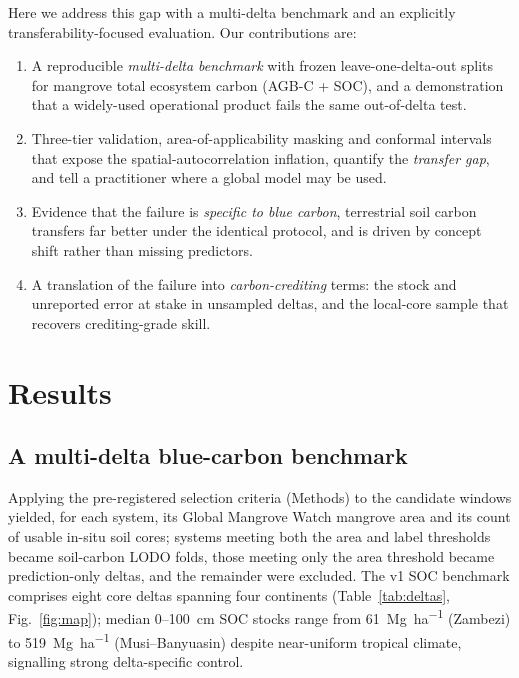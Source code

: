 \documentclass[11pt]{article}
\begin{document}
Here we address this gap with a multi-delta benchmark and an explicitly
transferability-focused evaluation. Our contributions are:
\begin{enumerate}
  \item A reproducible \emph{multi-delta benchmark} with frozen leave-one-delta-out
        splits for mangrove total ecosystem carbon (AGB-C + SOC), and a demonstration
        that a widely-used operational product fails the same out-of-delta test.
  \item Three-tier validation, area-of-applicability masking \citep{meyer2021} and
        conformal intervals that expose the spatial-autocorrelation inflation, quantify
        the \emph{transfer gap}, and tell a practitioner where a global model may be used.
  \item Evidence that the failure is \emph{specific to blue carbon}, terrestrial soil
        carbon transfers far better under the identical protocol, and is driven by
        concept shift rather than missing predictors.
  \item A translation of the failure into \emph{carbon-crediting} terms: the stock and
        unreported error at stake in unsampled deltas, and the local-core sample that
        recovers crediting-grade skill.
\end{enumerate}

\section{Results}

\subsection{A multi-delta blue-carbon benchmark}
Applying the pre-registered selection criteria (Methods) to the candidate windows
yielded, for each system, its Global Mangrove Watch mangrove area and its count of
usable in-situ soil cores; systems meeting both the area and label thresholds became
soil-carbon LODO folds, those meeting only the area threshold became prediction-only
deltas, and the remainder were excluded. The v1 SOC benchmark comprises eight core
deltas spanning four continents (Table~\ref{tab:deltas}, Fig.~\ref{fig:map}); median
0--100~cm SOC stocks range from
\SI{61}{\mega\gram\per\hectare} (Zambezi) to \SI{519}{\mega\gram\per\hectare}
(Musi--Banyuasin) despite near-uniform tropical climate, signalling strong
delta-specific control.
\end{document}

